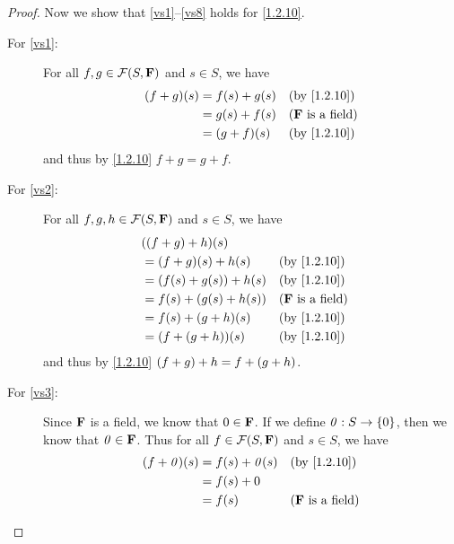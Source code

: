 \begin{proof}
    Now we show that \ref{vs1}--\ref{vs8} holds for \cref{1.2.10}.
    \begin{description}
        \item[For \ref{vs1}:]
            For all \(f, g \in \mathcal{F}\p{S, \F}\) and \(s \in S\), we have
            \begin{align*}
                \p{f + g}\p{s} & = f\p{s} + g\p{s} &  & \text{(by \cref{1.2.10})}  \\
                               & = g\p{s} + f\p{s} &  & \text{(\(\F\) is a field)} \\
                               & = \p{g + f}\p{s}  &  & \text{(by \cref{1.2.10})}
            \end{align*}
            and thus by \cref{1.2.10} \(f + g = g + f\).
        \item[For \ref{vs2}:]
            For all \(f, g, h \in \mathcal{F}\p{S, \F}\) and \(s \in S\), we have
            \begin{align*}
                 & \p{\p{f + g} + h}\p{s}                                         \\
                 & = \p{f + g}\p{s} + h\p{s}      &  & \text{(by \cref{1.2.10})}  \\
                 & = \p{f\p{s} + g\p{s}} + h\p{s} &  & \text{(by \cref{1.2.10})}  \\
                 & = f\p{s} + \p{g\p{s} + h\p{s}} &  & \text{(\(\F\) is a field)} \\
                 & = f\p{s} + \p{g + h}\p{s}      &  & \text{(by \cref{1.2.10})}  \\
                 & = \p{f + \p{g + h}}\p{s}       &  & \text{(by \cref{1.2.10})}
            \end{align*}
            and thus by \cref{1.2.10} \(\left\lparen f + g\right\rparen + h = f + \left\lparen g + h\right\rparen\).
        \item[For \ref{vs3}:]
            Since \(\mathbf{F}\) is a field, we know that \(0 \in \mathbf{F}\).
            If we define \(\mathit{0} : S \to \{0\}\), then we know that \(\mathit{0} \in \mathbf{F}\).
            Thus for all \(f \in \mathcal{F}\p{S, \F}\) and \(s \in S\), we have
            \begin{align*}
                \p{f + \zv}\p{s} & = f\p{s} + \zv\p{s} &  & \text{(by \cref{1.2.10})}  \\
                                 & = f\p{s} + 0                                        \\
                                 & = f\p{s}            &  & \text{(\(\F\) is a field)}
            \end{align*}

\end{description}
\end{proof}
